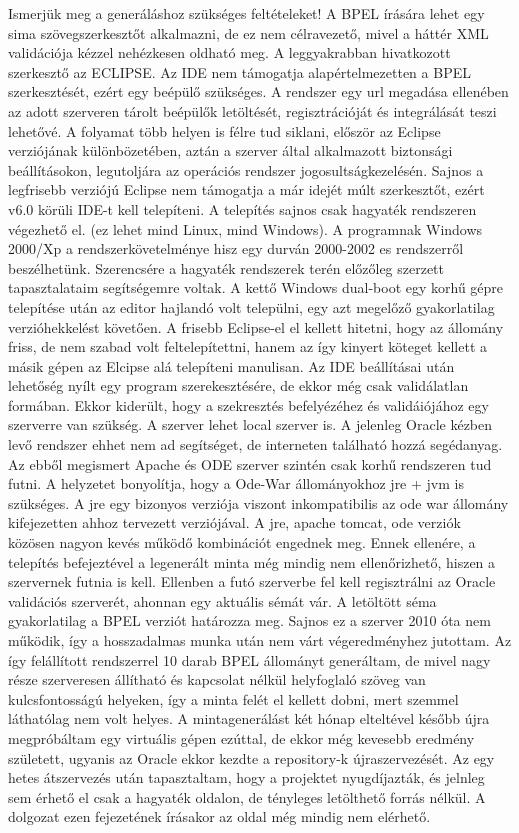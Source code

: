 Ismerjük meg a generáláshoz szükséges feltételeket! A BPEL írására lehet egy sima szövegszerkesztőt alkalmazni, de ez nem célravezető, mivel a háttér XML validációja kézzel nehézkesen oldható meg. A leggyakrabban hivatkozott szerkesztő az ECLIPSE. Az IDE nem támogatja alapértelmezetten a BPEL szerkesztését, ezért egy beépülő szükséges. A rendszer egy url megadása ellenében az adott szerveren tárolt beépülők letöltését, regisztrációját és integrálását teszi lehetővé. A folyamat több helyen is félre tud siklani, először az Eclipse verziójának különbözetében, aztán a szerver által alkalmazott biztonsági beállításokon, legutoljára az operációs rendszer jogosultságkezelésén. Sajnos a legfrisebb verziójú Eclipse nem támogatja a már idejét múlt szerkesztőt, ezért v6.0 körüli IDE-t kell telepíteni. A telepítés sajnos csak hagyaték rendszeren végezhető el. (ez lehet mind Linux, mind Windows). A programnak Windows 2000/Xp a rendszerkövetelménye hisz egy durván 2000-2002 es rendszerről beszélhetünk. Szerencsére a hagyaték rendszerek terén előzőleg szerzett tapasztalataim segítségemre voltak. A kettő Windows dual-boot egy korhű gépre telepítése után az editor hajlandó volt települni, egy azt megelőző gyakorlatilag verzióhekkelést követően. A frisebb Eclipse-el el kellett hitetni, hogy az állomány friss, de nem szabad volt feltelepítettni, hanem az így kinyert köteget kellett a másik gépen az Elcipse alá telepíteni manulisan. Az IDE beállításai után lehetőség nyílt egy program szerekesztésére, de ekkor még csak validálatlan formában. Ekkor kiderült, hogy a szekresztés befelyézéhez és validáiójához egy szerverre van szükség. A szerver lehet local szerver is. A jelenleg Oracle kézben levő rendszer ehhet nem ad segítséget, de interneten található hozzá segédanyag.\cite{helloworld} Az ebből megismert Apache és ODE szerver szintén csak korhű rendszeren tud futni. A helyzetet bonyolítja, hogy a Ode-War állományokhoz jre + jvm is szükséges. A jre egy bizonyos verziója viszont inkompatibilis az ode war állomány kifejezetten ahhoz tervezett verziójával. A jre, apache tomcat, ode verziók közösen nagyon kevés működő kombinációt engednek meg. Ennek ellenére, a telepítés befejeztével a legenerált minta még mindig nem ellenőrizhető, hiszen a szervernek futnia is kell. Ellenben a futó szerverbe fel kell regisztrálni az Oracle validációs szerverét, ahonnan egy aktuális sémát vár. A letöltött séma gyakorlatilag  a BPEL verziót határozza meg. Sajnos ez a szerver 2010 óta nem működik, így a hosszadalmas munka után nem várt végeredményhez jutottam. Az így felállított rendszerrel 10 darab BPEL állományt generáltam, de mivel nagy része szerveresen állítható és kapcsolat nélkül helyfoglaló szöveg van kulcsfontosságú helyeken, így a minta felét el kellett dobni, mert szemmel láthatólag nem volt helyes. A mintagenerálást két hónap elteltével később újra megpróbáltam egy virtuális gépen ezúttal, de ekkor még kevesebb eredmény született, ugyanis az Oracle ekkor kezdte a repository-k újraszervezését. Az egy hetes átszervezés után tapasztaltam, hogy a projektet nyugdíjazták, és jelnleg sem érhető el csak a hagyaték oldalon, de tényleges letölthető forrás nélkül. A dolgozat ezen fejezetének írásakor az oldal még mindig nem elérhető. 

